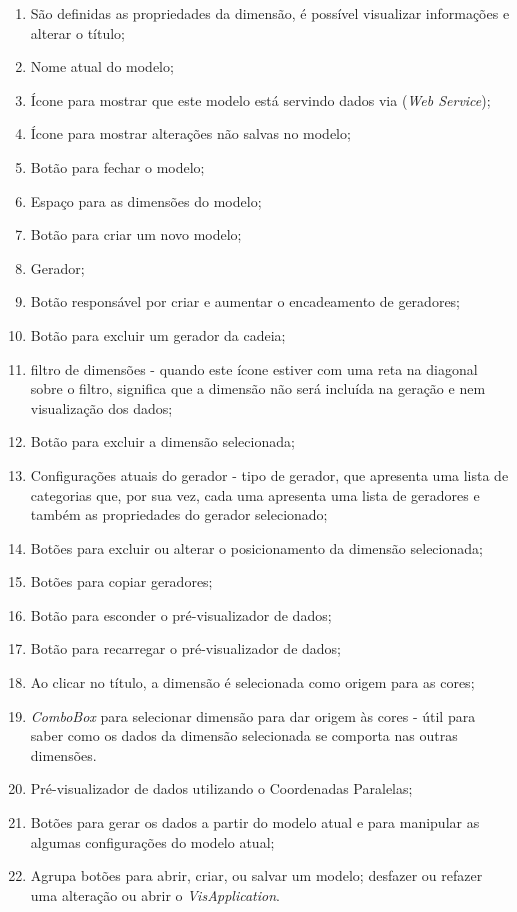 \documentclass[
	12pt,				%
	openright,			%
	oneside,			%
	a4paper,			%
	english,			%
	brazil				%
	]{abntex2}
\begin{document}
		\begin{enumerate}
			\item São definidas as propriedades da dimensão, é possível visualizar informações e alterar o título;
			\item Nome atual do modelo;
			\item Ícone para mostrar que este modelo está servindo dados via (\emph{Web Service});
			\item Ícone para mostrar alterações não salvas no modelo;
			\item Botão para fechar o modelo;
			\item Espaço para as dimensões do modelo;
			\item Botão para criar um novo modelo;
			\item Gerador;
			\item Botão responsável por criar e aumentar o encadeamento de geradores;
			\item Botão para excluir um gerador da cadeia;
			\item filtro de dimensões - quando este ícone estiver com uma reta na diagonal sobre o filtro, significa que a dimensão não será incluída na geração e nem visualização dos dados;
			\item Botão para excluir a dimensão selecionada;
			\item Configurações atuais do gerador - tipo de gerador, que apresenta uma lista de categorias que, por sua vez, cada uma apresenta uma lista de geradores e também as propriedades do gerador selecionado;
			\item Botões para excluir ou alterar o posicionamento da dimensão selecionada;
			\item Botões para copiar geradores;
			\item Botão para esconder o pré-visualizador de dados;
			\item Botão para recarregar o pré-visualizador de dados;
			\item Ao clicar no título, a dimensão é selecionada como origem para as cores;
			\item \emph{ComboBox} para selecionar dimensão para dar origem às cores - útil para saber como os dados da dimensão selecionada se comporta nas outras dimensões.
			\item Pré-visualizador de dados utilizando o Coordenadas Paralelas;
			\item Botões para gerar os dados a partir do modelo atual e para manipular as algumas configurações do modelo atual;
			\item Agrupa botões para abrir, criar, ou salvar um modelo; desfazer ou refazer uma alteração ou abrir o \emph{VisApplication}.
		\end{enumerate}
\end{document}
